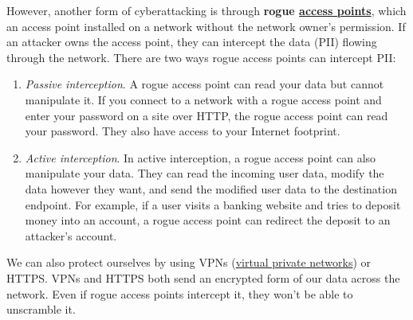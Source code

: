 \documentclass{article}
\newcounter{example}[section]
\begin{document}
  However, another form of cyberattacking is through \textbf{rogue \hyperref[def:access-point]{access points}}, which an access point installed on a network without the network owner's permission. If an attacker owns the access point, they can intercept the data (PII) flowing through the network. There are two ways rogue access points can intercept PII: 
  \begin{enumerate}
      \item \textit{Passive interception}. A rogue access point can read your data but cannot manipulate it. If you connect to a network with a rogue access point and enter your password on a site over HTTP, the rogue access point can read your password. They also have access to your Internet footprint. 
      \item \textit{Active interception}. In active interception, a rogue access point can also manipulate your data. They can read the incoming user data, modify the data however they want, and send the modified user data to the destination endpoint. For example, if a user visits a banking website and tries to deposit money into an account, a rogue access point can redirect the deposit to an attacker’s account. 
  \end{enumerate}

  We can also protect ourselves by using VPNs (\hyperref[def:virtual-private-network]{virtual private networks}) or HTTPS. VPNs and HTTPS both send an encrypted form of our data across the network. Even if rogue access points intercept it, they won’t be able to unscramble it. 
\end{document}
